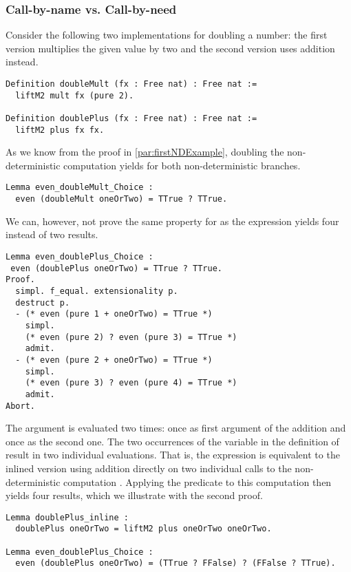 \subsubsection{Call-by-name vs. Call-by-need}
\label{subsubsec:cbneed}
 
Consider the following two implementations for doubling a number: the first version multiplies the given value by two and the second version uses addition instead.

\begin{verbatim}
Definition doubleMult (fx : Free nat) : Free nat :=
  liftM2 mult fx (pure 2).

Definition doublePlus (fx : Free nat) : Free nat :=
  liftM2 plus fx fx.
\end{verbatim}

As we know from the proof in \autoref{par:firstNDExample}, doubling the non-deterministic computation  yields  for both non-deterministic branches.

\begin{verbatim}
Lemma even_doubleMult_Choice :
  even (doubleMult oneOrTwo) = TTrue ? TTrue.
\end{verbatim}

We can, however, not prove the same property for  as the expression yields four instead of two results.

\begin{verbatim}
Lemma even_doublePlus_Choice :
 even (doublePlus oneOrTwo) = TTrue ? TTrue.
Proof.
  simpl. f_equal. extensionality p.
  destruct p.
  - (* even (pure 1 + oneOrTwo) = TTrue *)
    simpl.
    (* even (pure 2) ? even (pure 3) = TTrue *)
    admit.
  - (* even (pure 2 + oneOrTwo) = TTrue *)
    simpl.
    (* even (pure 3) ? even (pure 4) = TTrue *)
    admit.
Abort.
\end{verbatim}

The argument  is evaluated two times: once as first argument of the addition and once as the second one.
The two occurrences of the variable  in the definition of  result in two individual evaluations.
That is, the expression is equivalent to the inlined version using addition directly on two individual calls to the non-deterministic computation .
Applying the predicate  to this computation then yields four results, which we illustrate with the second proof.

\begin{verbatim}
Lemma doublePlus_inline :
  doublePlus oneOrTwo = liftM2 plus oneOrTwo oneOrTwo.

Lemma even_doublePlus_Choice :
  even (doublePlus oneOrTwo) = (TTrue ? FFalse) ? (FFalse ? TTrue).
\end{verbatim}


